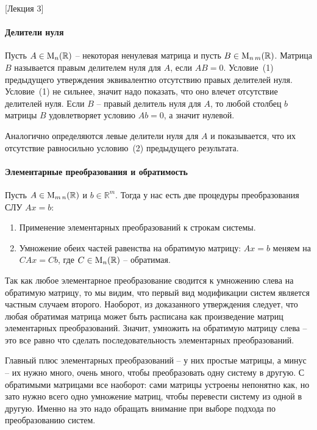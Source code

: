 [Лекция 3]

\paragraph{Делители нуля}
Пусть $A\in\operatorname{M}_{n}(\mathbb R)$ -- некоторая ненулевая матрица и пусть $B\in\operatorname{M}_{n\,m}(\mathbb R)$.
Матрица $B$ называется правым делителем нуля для $A$, если $AB = 0$.
Условие~(1) предыдущего утверждения эквивалентно отсутствию правых делителей нуля.
Условие~(1) не сильнее, значит надо показать, что оно влечет отсутствие делителей нуля.
Если $B$ -- правый делитель нуля для $A$, то любой столбец $b$ матрицы $B$ удовлетворяет условию $Ab = 0$, а значит нулевой.

Аналогично определяются левые делители нуля для $A$ и показывается, что их отсутствие равносильно условию~(2) предыдущего результата.

\paragraph{Элементарные преобразования и обратимость}

Пусть $A\in\operatorname{M}_{m\,n}(\mathbb R)$ и $b\in\mathbb R^m$.
Тогда у нас есть две процедуры преобразования СЛУ $Ax = b$:
\begin{enumerate}
\item Применение элементарных преобразований к строкам системы.
\item Умножение обеих частей равенства на обратимую матрицу: $Ax=b$ меняем на $CAx = Cb$, где $C\in\operatorname{M}_{n}(\mathbb R)$ -- обратимая.
\end{enumerate}

Так как любое элементарное преобразование сводится к умножению слева на обратимую матрицу, то мы видим, что первый вид модификации систем является частным случаем второго.
Наоборот, из доказанного утверждения следует, что любая обратимая матрица может быть расписана как произведение матриц элементарных преобразований.
Значит, умножить на обратимую матрицу слева -- это все равно что сделать последовательность элементарных преобразований.

Главный плюс элементарных преобразований -- у них простые матрицы, а минус -- их нужно много, очень много, чтобы преобразовать одну систему в другую.
С обратимыми матрицами все наоборот: сами матрицы устроены непонятно как, но зато нужно всего одно умножение матриц, чтобы перевести систему из одной в другую.
Именно на это надо обращать внимание при выборе подхода по преобразованию систем.


